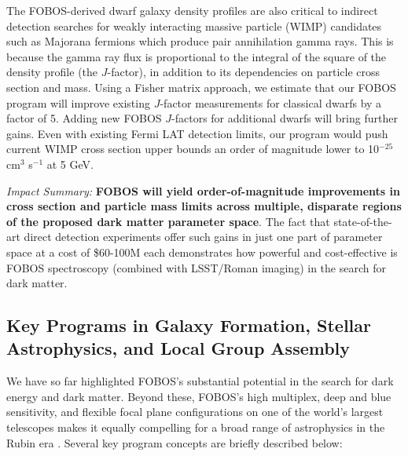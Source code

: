 \documentclass[oneside,11pt]{amsart}
\begin{document}
The FOBOS-derived dwarf galaxy density profiles are also critical to indirect detection searches for weakly interacting massive particle (WIMP) candidates such as Majorana fermions which produce pair annihilation gamma rays.  This is because the gamma ray flux is proportional to the integral of the square of the density profile (the $J$-factor), in addition to its dependencies on particle cross section and mass.  Using a Fisher matrix approach, we estimate that our FOBOS program will improve existing $J$-factor measurements for classical dwarfs by a factor of 5.  Adding new FOBOS $J$-factors for additional dwarfs will bring further gains.  Even with existing Fermi LAT detection limits, our program would push current WIMP cross section upper bounds an order of magnitude lower to 10$^{-25}$ cm$^3$ s$^{-1}$ at 5 GeV.

\medskip
\noindent \emph{Impact Summary:} \textbf{FOBOS will yield order-of-magnitude improvements in cross section and particle mass limits across multiple, disparate regions of the proposed dark matter parameter space}.  The fact that state-of-the-art direct detection experiments offer such gains in just one part of parameter space at a cost of \$60-100M each demonstrates how powerful and cost-effective is FOBOS spectroscopy (combined with LSST/Roman imaging) in the search for dark matter.



 


\subsection{Key Programs in Galaxy Formation, Stellar Astrophysics, and Local Group Assembly}

We have so far highlighted FOBOS's substantial potential in the search for dark energy and dark matter.  Beyond these, FOBOS's high multiplex, deep and blue sensitivity, and flexible focal plane configurations on one of the world's largest telescopes makes it equally compelling for a broad range of astrophysics in the Rubin era \citep[see][]{bundy19}.  Several key program concepts are briefly described below:
\end{document}
